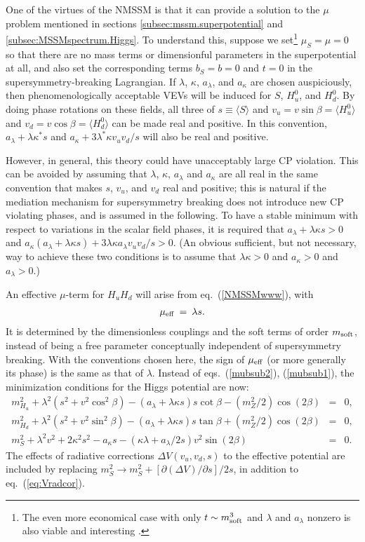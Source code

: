 \documentclass[12pt]{article}
\def\beq{\begin{eqnarray}}
\def\eeq{\end{eqnarray}}
\begin{document}
One of the virtues of the NMSSM is that it can provide a solution to the
$\mu$ problem mentioned in sections \ref{subsec:mssm.superpotential} and
\ref{subsec:MSSMspectrum.Higgs}. To understand this, suppose we
set\footnote{The even more economical case with only $t \sim m_{\rm
soft}^3$ and $\lambda$ and $a_\lambda$ nonzero is also viable and
interesting \cite{nMSSM}.} $\mu_S = \mu = 0$ so that there are no mass
terms or dimensionful parameters in the superpotential at all, and also
set the corresponding terms $b_S = b = 0$ and $t=0$ in the
supersymmetry-breaking Lagrangian.  If 
$\lambda$, $\kappa$, $a_\lambda$, and $a_{\kappa}$ are chosen
auspiciously, then phenomenologically acceptable VEVs will be induced for
$S$, $H_u^0$, and $H_d^0$.  By doing phase rotations on these fields, all
three of $s \equiv \langle S \rangle$ and $v_u = v \sin\beta = \langle
H_u^0 \rangle$ and $v_d = v \cos\beta = \langle H_d^0 \rangle$ can be made
real and positive. In this convention, $a_\lambda + \lambda \kappa^* s$
and $a_{\kappa} + 3 \lambda^* \kappa v_u v_d/s$ will also be real and
positive. 

However, in general, this theory could have unacceptably large CP 
violation. This can be avoided by assuming that $\lambda$, $\kappa$, 
$a_\lambda$ and $a_\kappa$ are all real in the same convention that makes 
$s$, $v_u$, and $v_d$ real and positive; this is natural if the mediation 
mechanism for supersymmetry breaking does not introduce new CP violating 
phases, and is assumed in the following. To have a stable minimum with 
respect to variations in the scalar 
field phases, it is required that $a_\lambda + 
\lambda \kappa s > 0$ and $a_\kappa (a_\lambda + \lambda \kappa s) + 3 
\lambda \kappa a_\lambda v_u v_d/s > 0$. (An obvious sufficient, but not
necessary, way to achieve these two conditions is to assume that 
$\lambda \kappa > 0$ and $a_\kappa>0$ and $a_\lambda > 0$.)

An effective $\mu$-term for $H_u H_d$ will arise from
eq.~(\ref{NMSSMwww}), with \beq \mu_{\rm eff} \>=\> \lambda s. \eeq It is
determined by the dimensionless couplings and the soft terms of order
$m_{\rm soft}$, instead of being a free parameter conceptually independent
of supersymmetry breaking. With the conventions chosen here, the
sign of $\mu_{\rm eff}$ (or more generally its phase) is the same as that
of $\lambda$. Instead of eqs.~(\ref{mubsub2}), (\ref{mubsub1}), the
minimization conditions for the Higgs potential are now: 
\beq
m^2_{H_u} + \lambda^2 (s^2 + v^2 \cos^2\beta) 
- (a_\lambda + \lambda \kappa s) s \cot\beta
- (m_Z^2/2) \cos(2\beta) &=& 0,
\\
m^2_{H_d} + \lambda^2 (s^2 + v^2 \sin^2\beta) 
-(a_\lambda + \lambda \kappa s) s \tan\beta
+ (m_Z^2/2) \cos(2\beta) &=& 0,
\\
m^2_{S} + \lambda^2 v^2 + 2 \kappa^2 s^2 - a_\kappa s
-(\kappa\lambda  + a_\lambda/2 s) v^2 \sin(2\beta) &=& 0.
\eeq
The effects of radiative corrections $\Delta V(v_u,v_d,s)$ to the
effective potential are included by replacing $m_S^2 \rightarrow m_S^2 +
[\partial (\Delta V)/\partial s]/2s$, in addition to
eq.~(\ref{eq:Vradcor}). 
\end{document}
